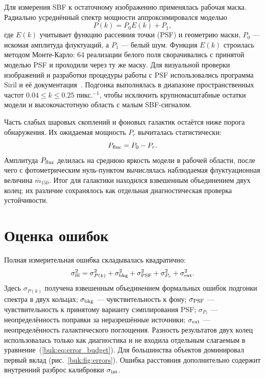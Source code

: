 Для измерения SBF к остаточному изображению применялась рабочая маска. Радиально усреднённый спектр мощности аппроксимировался моделью
\begin{equation}
    P(k)=P_0E(k)+P_1,
    \label{buk:eq:power_fit}
\end{equation}
где $E(k)$ учитывает функцию рассеяния точки (PSF) и геометрию маски, $P_0$ --- искомая амплитуда флуктуаций, а $P_1$ --- белый шум. Функция $E(k)$ строилась методом Монте-Карло: 64 реализации белого поля сворачивались с принятой моделью PSF и проходили через ту же маску. Для визуальной проверки изображений и разработки процедуры работы с PSF использовались программа Siril и её документация~\cite{Richard2024Siril}. Подгонка выполнялась в диапазоне пространственных частот $0.04\leq k\leq0.25$ пикс.$^{-1}$, чтобы исключить крупномасштабные остатки модели и высокочастотную область с малым SBF-сигналом.

Часть слабых шаровых скоплений и фоновых галактик остаётся ниже порога обнаружения. Их ожидаемая мощность $P_r$ вычиталась статистически:
\begin{equation}
    P_{\rm fluc}=P_0-P_r.
\end{equation}
Амплитуда $P_{\rm fluc}$ делилась на среднюю яркость модели в рабочей области, после чего с фотометрическим нуль-пунктом вычислялась наблюдаемая флуктуационная величина $\overline m_{150}$. Итог для галактики находился взвешенным объединением двух колец; их различие сохранялось как отдельная диагностическая проверка устойчивости.

\section{Оценка ошибок}

Полная измерительная ошибка складывалась квадратично:
\begin{equation}
 \sigma_{\overline m}^2=\sigma_{P(k)}^2+\sigma_{\rm bkg}^2+
 \sigma_{\rm PSF}^2+\sigma_{P_r}^2+\sigma_{\rm ext}^2.
 \label{buk:eq:error_budget}
\end{equation}
Здесь $\sigma_{P(k)}$ получена взвешенным объединением формальных ошибок подгонки спектра в двух кольцах; $\sigma_{\rm bkg}$ --- чувствительность к фону; $\sigma_{\rm PSF}$ --- чувствительность к принятому варианту сэмплирования PSF; $\sigma_{P_r}$ --- неопределённость поправки за неразрешённые источники; $\sigma_{\rm ext}$ --- неопределённость галактического поглощения. Разность результатов двух колец использовалась только как диагностика и не входила отдельным слагаемым в уравнение~(\ref{buk:eq:error_budget}). Для большинства объектов доминировал первый вклад (рис.~\ref{buk:fig:errors}). Ошибка расстояния дополнительно содержит внутренний разброс калибровки $\sigma_{\rm int}$.

